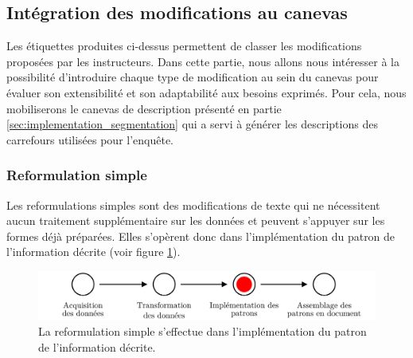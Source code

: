 \subsection{Intégration des modifications au canevas}
\label{sec:evaluation_pipeline}

Les étiquettes produites ci-dessus permettent de classer les modifications proposées par les instructeurs. Dans cette partie, nous allons nous intéresser à la possibilité d'introduire chaque type de modification au sein du canevas pour évaluer son  extensibilité et son adaptabilité aux besoins exprimés. Pour cela, nous mobiliserons le canevas de description présenté en partie \ref{sec:implementation_segmentation} qui a servi à générer les descriptions des carrefours utilisées pour l'enquête.


\subsubsection{Reformulation simple}

Les reformulations simples sont des modifications de texte qui ne nécessitent aucun traitement supplémentaire sur les données et peuvent s'appuyer sur les formes déjà préparées. Elles s'opèrent donc dans l'implémentation du patron de l'information décrite (voir figure \ref{fig:evaluation_reformulation_simple}). 

\begin{figure}[ht]
    \centering
    \includegraphics[width=\textwidth]{images/evaluation/pipeline/pipeline_reformulation_simple.pdf}
    \caption[Reformulation simple dans la chaîne de description]{La reformulation simple s'effectue dans l'implémentation du patron de l'information décrite.}
    \label{fig:evaluation_reformulation_simple}
\end{figure}

\newpar{}

